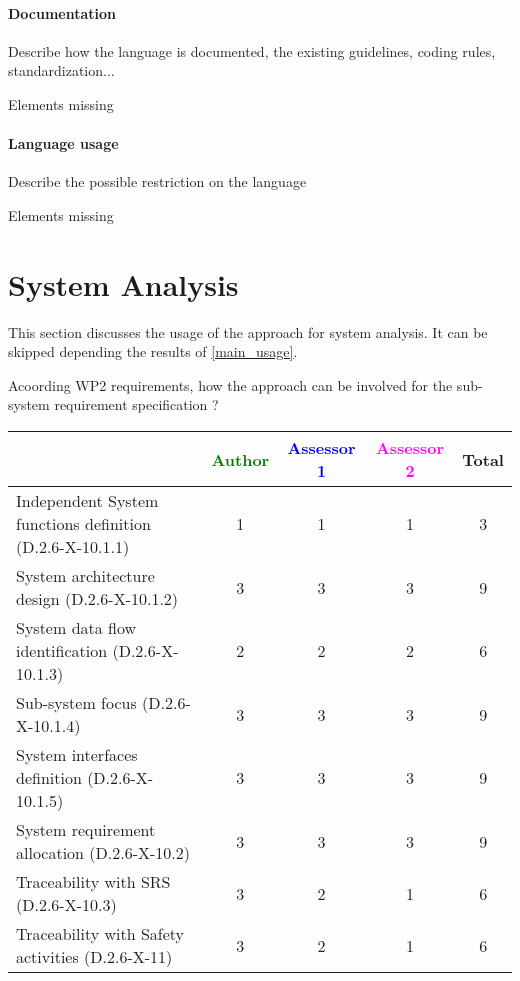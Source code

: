 \paragraph{Documentation} Describe how the language is documented, the existing guidelines, coding rules, standardization...


\begin{assessor2}
Elements missing
\end{assessor2}


\paragraph{Language usage} Describe the possible restriction on the language


\begin{assessor2}
Elements missing
\end{assessor2}



\section{System Analysis}
This section discusses the usage of the approach for system analysis.
It can be skipped depending the results of \ref{main_usage}.

Acoording WP2 requirements, how the approach can be involved for the sub-system requirement specification ?

\begin{tabular}{|l | c | c | c | c|}
\hline
& \textcolor{green}{Author} & \textcolor{blue}{Assessor 1} & \textcolor{magenta}{Assessor 2} & Total \\
\hline
Independent System functions definition (D.2.6-X-10.1.1) & 1 & 1 & 1 & 3 \\
\hline
System architecture design (D.2.6-X-10.1.2) & 3 & 3 & 3  & 9 \\
\hline
System data flow identification (D.2.6-X-10.1.3) & 2 & 2 & 2 & 6 \\
\hline
Sub-system focus (D.2.6-X-10.1.4) & 3 & 3 & 3 & 9 \\
\hline
System interfaces definition (D.2.6-X-10.1.5) & 3 & 3 & 3 &  9\\
\hline
System requirement allocation (D.2.6-X-10.2) & 3 & 3 & 3 & 9 \\
\hline
Traceability with SRS (D.2.6-X-10.3) & 3 & 2 & 1 & 6 \\
\hline
Traceability with Safety activities (D.2.6-X-11) & 3 & 2 & 1 & 6 \\
\hline
\end{tabular}

